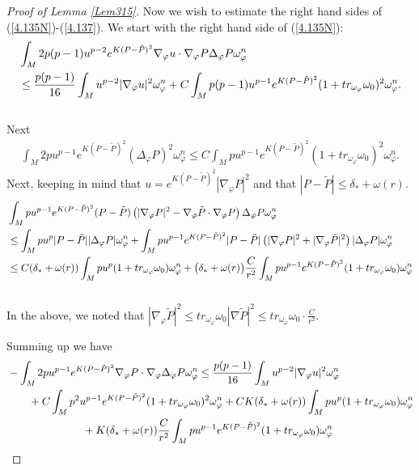 \documentclass[10pt,a4paper]{amsart}
\begin{document}
\begin{proof}[Proof of Lemma \ref{Lem315}]
Now we wish to estimate the right hand sides of (\ref{4.135N})-(\ref{4.137}).
We start with the right hand side of (\ref{4.135N}):
\begin{align}
	&\int_M2p(p-1)u^{p-2}e^{K(P-\tilde P)^2}\nabla_{\varphi}u\cdot \nabla_{\varphi}P\Delta_{\varphi}P\omega_{\varphi}^n \notag \\
	&\le  \frac{p(p-1)}{16}\int_Mu^{p-2}|\nabla_{\varphi}u|^2\omega_{\varphi}^n + C \int_M p(p-1)u^{p-1}e^{K(P-\tilde P)^2}(1+tr_{\omega_{\varphi}}\omega_0)^2\omega_{\varphi}^n.
\end{align}\\
Next
\begin{align}
	\int_M2pu^{p-1}e^{K(P-\tilde P)^2}(\Delta_{\varphi}P)^2\omega_{\varphi}^n\le  C \int_M pu^{p-1}e^{K(P-\tilde P)^2}(1+tr_{\omega_{\varphi}}\omega_0)^2\omega_{\varphi}^n.
\end{align}
Next,  keeping in mind that $u=e^{K(P-\tilde{P})^2}|\nabla_{\varphi}P|^2$ and that $|P-\tilde{P}|\le \delta_*+\omega(r)$.
\begin{align}
	&\int_M pu^{p-1}e^{K(P-\tilde P)^2} (P-\tilde P)\left( |\nabla_{\varphi}P|^2-\nabla_\varphi\tilde P\cdot\nabla_\varphi P \right) \Delta_{\varphi}P\omega_{\varphi}^n \notag\\
	& \le  \int_M pu^p |P-\tilde P||\Delta_\varphi P|\omega_\varphi^n + \int_M pu^{p-1}e^{K(P-\tilde P)^2} |P-\tilde P|\left( |\nabla_{\varphi}P|^2 +|\nabla_\varphi\tilde P|^2 \right) |\Delta_{\varphi}P| \omega_{\varphi}^n \notag\\
	&  \le  C(\delta_*+\omega(r)) \int_M pu^p  (1+tr_{\omega_{\varphi}}\omega_0)\omega_\varphi^n + \big(\delta_*+\omega(r)\big)\frac{C}{r^2} \int_M pu^{p-1} e^{K(P-\tilde P)^2}(1+tr_{\omega_{\varphi}}\omega_0)\omega_\varphi^n 
\end{align}\\

In the above,  we noted that $|\nabla_{\varphi}\tilde{P}|^2\le tr_{\omega_{\varphi}}\omega_0|\nabla \tilde{P}|^2\le tr_{\omega_{\varphi}}\omega_0\cdot \frac{C}{r^2}$.

Summing up we have 
\begin{align}\label{4.142}
	& -\int_M2pu^{p-1}e^{K(P-\tilde P)^2}\nabla_{\varphi}P\cdot \nabla_{\varphi}\Delta_{\varphi}P\omega_{\varphi}^n \le  \frac{p(p-1)}{16}\int_Mu^{p-2}|\nabla_{\varphi}u|^2\omega_{\varphi}^n \notag\\
	&\quad\quad + C \int_M p^2u^{p-1}e^{K(P-\tilde P)^2}(1+tr_{\omega_{\varphi}}\omega_0)^2\omega_{\varphi}^n +CK(\delta_*+\omega(r)) \int_M pu^p  (1+tr_{\omega_{\varphi}}\omega_0)\omega_\varphi^n \notag\\
	&\quad\quad\quad\quad\quad\quad\quad + K(\delta_*+\omega(r))\frac{C}{r^2} \int_M pu^{p-1} e^{K(P-\tilde P)^2}(1+tr_{\omega_{\varphi}}\omega_0)\omega_\varphi^n 
\end{align}


\end{proof}
\end{document}
